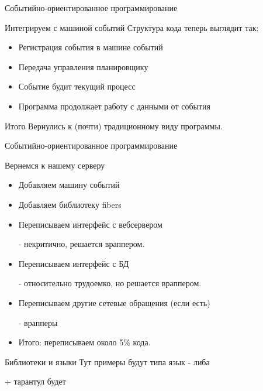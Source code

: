 \documentclass[aspectratio=169]{beamer}
\begin{document}
\begin{frame}{Событийно-ориентированное программирование}
    \begin{block}{Интегрируем с машиной событий}
        Структура кода теперь выглядит так:
        \begin{itemize}
            \pause\item Регистрация события в машине событий
            \pause\item Передача управления планировщику
            \pause\item Событие будит текущий процесс
            \pause\item Программа продолжает работу с данными от события
        \end{itemize}
    \end{block}
    \pause
    \begin{block}{Итого}
        Вернулись к (почти) традиционному виду программы.
    \end{block}
\end{frame}

\begin{frame}{Событийно-ориентированное программирование} 
    \begin{block}{Вернемся к нашему серверу}
        \begin{itemize}
            \pause\item Добавляем машину событий
            \pause\item Добавляем библиотеку fibers
            \pause\item Переписываем интерфейс с вебсервером
                \pause\par - некритично, решается враппером.
            \pause\item Переписываем интерфейс с БД
                \pause\par - относительно трудоемко, но решается враппером.
            \pause\item Переписываем другие сетевые обращения (если есть)
                \pause\par - врапперы

            \pause\item Итого: переписываем около 5\% кода.
        \end{itemize}
    \end{block}
\end{frame}

\begin{frame}{Библиотеки и языки}
    Тут примеры будут типа язык - либа

    + тарантул будет
\end{frame}
\end{document}
